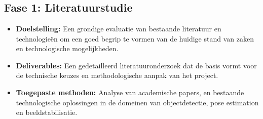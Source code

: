 
\chapter{}%
\label{ch:methodologie}

\section{Fase 1: Literatuurstudie}
\begin{itemize}
\item \textbf{Doelstelling:} Een grondige evaluatie van bestaande literatuur en technologieën om een goed begrip te vormen van de huidige stand van zaken en technologische mogelijkheden.
\item \textbf{Deliverables:} Een gedetailleerd literatuuronderzoek dat de basis vormt voor de technische keuzes en methodologische aanpak van het project.
\item \textbf{Toegepaste methoden:} Analyse van academische papers, en bestaande technologische oplossingen in de domeinen van objectdetectie, pose estimation en beeldstabilisatie.
\end{itemize}
